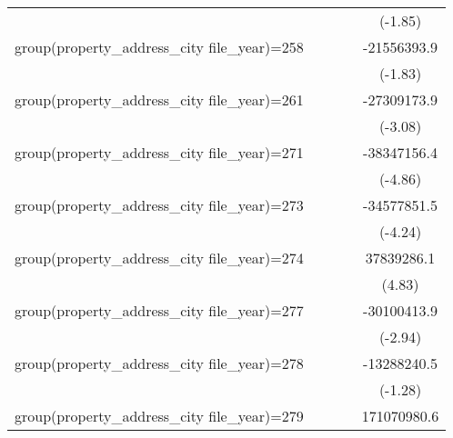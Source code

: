 {\begin{tabular}{l*{4}{c}}
                    &                     &                     &                     &     (-1.85)         \\
\addlinespace
group(property\_address\_city file\_year)=258&                     &                     &                     & -21556393.9         \\
                    &                     &                     &                     &     (-1.83)         \\
\addlinespace
group(property\_address\_city file\_year)=261&                     &                     &                     & -27309173.9\sym{**} \\
                    &                     &                     &                     &     (-3.08)         \\
\addlinespace
group(property\_address\_city file\_year)=271&                     &                     &                     & -38347156.4\sym{***}\\
                    &                     &                     &                     &     (-4.86)         \\
\addlinespace
group(property\_address\_city file\_year)=273&                     &                     &                     & -34577851.5\sym{***}\\
                    &                     &                     &                     &     (-4.24)         \\
\addlinespace
group(property\_address\_city file\_year)=274&                     &                     &                     &  37839286.1\sym{***}\\
                    &                     &                     &                     &      (4.83)         \\
\addlinespace
group(property\_address\_city file\_year)=277&                     &                     &                     & -30100413.9\sym{**} \\
                    &                     &                     &                     &     (-2.94)         \\
\addlinespace
group(property\_address\_city file\_year)=278&                     &                     &                     & -13288240.5         \\
                    &                     &                     &                     &     (-1.28)         \\
\addlinespace
group(property\_address\_city file\_year)=279&                     &                     &                     & 171070980.6\sym{***}\\

\end{tabular}}
